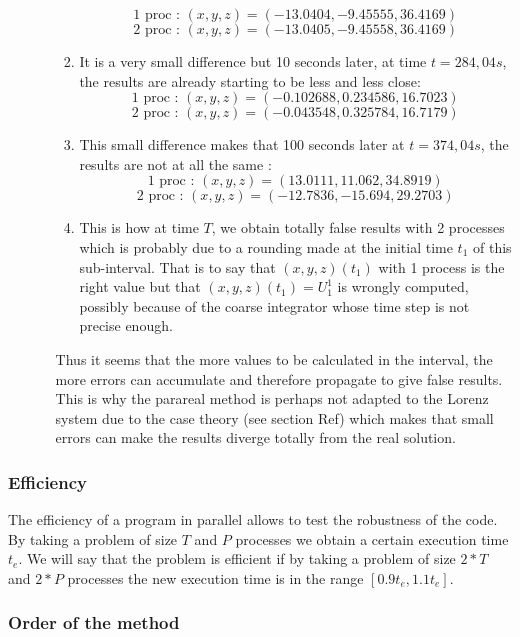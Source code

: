 \begin{enumerate}[label=\textbullet]
\begin{itemize}[label=-]
\begin{enumerate}[label=\ding{213}]
			$$\text{1 proc : } (x,y,z)=( -13.0404,-9.45555,36.4169)$$
			$$\text{2 proc : } (x,y,z)=(-13.0405,-9.45558,36.4169)$$
			\item It is a very small difference but 10 seconds later, at time $t=284,04s$, the results are already starting to be less and less close:
			$$\text{1 proc : } (x,y,z)=( -0.102688,0.234586,16.7023)$$
			$$\text{2 proc : } (x,y,z)=(-0.043548,0.325784,16.7179)$$
			\item This small difference makes that 100 seconds later at $t=374,04s$, the results are not at all the same :
			$$\text{1 proc : } (x,y,z)=(13.0111,11.062,34.8919)$$
			$$\text{2 proc : } (x,y,z)=(-12.7836,-15.694,29.2703)$$
			\item This is how at time $T$, we obtain totally false results with 2 processes which is probably due to a rounding made at the initial time $t_1$ of this sub-interval. That is to say that $(x,y,z)(t_1)$ with 1 process is the right value but that $(x,y,z)(t_1)=U_1^1$ is wrongly computed, possibly because of the coarse integrator whose time step is not precise enough.
		\end{enumerate}
		Thus it seems that the more values to be calculated in the interval, the more errors can accumulate and therefore propagate to give false results. This is why the parareal method is perhaps not adapted to the Lorenz system due to the case theory (see section Ref) which makes that small errors can make the results diverge totally from the real solution.
	\end{itemize}
\end{enumerate}


\subsubsection{Efficiency}

The efficiency of a program in parallel allows to test the robustness of the code. By taking a problem of size $T$ and $P$ processes we obtain a certain execution time $t_e$. We will say that the problem is efficient if by taking a problem of size $2*T$ and $2*P$ processes the new execution time is in the range $[0.9t_e,1.1t_e]$.

\subsubsection{Order of the method}

